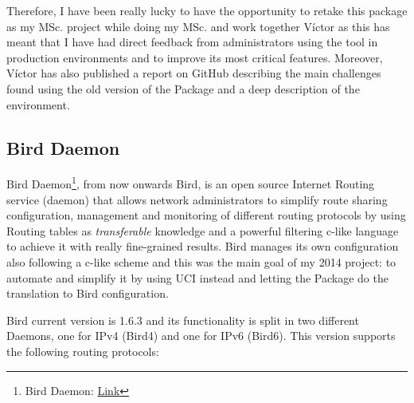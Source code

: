 Therefore, I have been really lucky to have the opportunity to retake this package as my MSc. project while doing my MSc. and work together Víctor as this has meant that I have had direct feedback from administrators using the tool in production environments and to improve its most critical features. Moreover, Víctor has also published a report on GitHub \cite{bgpbmx6} describing the main challenges found using the old version of the Package and a deep description of the environment.

\subsection{Bird Daemon}
Bird Daemon\footnote{Bird Daemon: \href{http://bird.network.cz/}{Link}}, from now onwards Bird, is an open source Internet Routing service (daemon) that allows network administrators to simplify route sharing configuration, management and monitoring of different routing protocols by using Routing tables as \textit{transferable} knowledge and a powerful filtering c-like language to achieve it with really fine-grained results. Bird manages its own configuration also following a c-like scheme and this was the main goal of my 2014 project: to automate and simplify it by using UCI instead and letting the Package do the translation to Bird configuration.

Bird current version is 1.6.3 and its functionality is split in two different Daemons, one for IPv4 (Bird4) and one for IPv6 (Bird6). This version supports the following routing protocols:
